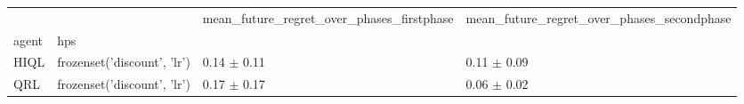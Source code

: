 \begin{tabular}{llll}
\toprule
 &  & mean_future_regret_over_phases_firstphase & mean_future_regret_over_phases_secondphase \\
agent & hps &  &  \\
\midrule
HIQL & frozenset({'discount', 'lr'}) & 0.14 $\pm$ 0.11 & 0.11 $\pm$ 0.09 \\
\cline{1-4}
QRL & frozenset({'discount', 'lr'}) & 0.17 $\pm$ 0.17 & 0.06 $\pm$ 0.02 \\
\cline{1-4}
\bottomrule
\end{tabular}
